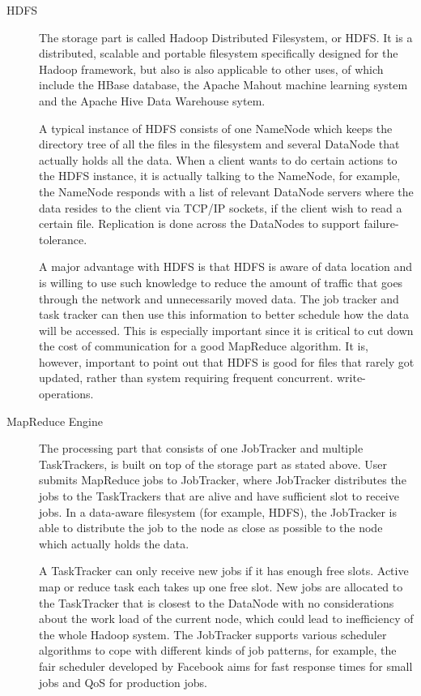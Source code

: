 \documentclass{article}
\begin{document}
\begin{description}
\item[HDFS] The storage part is called Hadoop Distributed Filesystem, or HDFS. It is a distributed, scalable and portable filesystem specifically designed for the Hadoop framework, but also is also applicable to other uses, of which include the HBase database, the Apache Mahout machine learning system and the Apache Hive Data Warehouse sytem.\cite{wiki:hadoop}

A typical instance of HDFS consists of one NameNode which keeps the directory tree of all the files in the filesystem and several DataNode that actually holds all the data. When a client wants to do certain actions to the HDFS instance, it is actually talking to the NameNode, for example, the NameNode responds with a list of relevant DataNode servers where the data resides to the client via TCP/IP sockets, if the client wish to read a certain file.\cite{hwiki:hadoop} Replication is done across the DataNodes to support failure-tolerance.

A major advantage with HDFS is that HDFS is aware of data location and is willing to use such knowledge to reduce the amount of traffic that goes through the network and unnecessarily moved data. The job tracker and task tracker can then use this information to better schedule how the data will be accessed. This is especially important since it is critical to cut down the cost of communication for a good MapReduce algorithm.\cite{ullman2012designing} It is, however, important to point out that HDFS is good for files that rarely got updated, rather than system requiring frequent concurrent. write-operations.\cite{wiki:hadoop}

\item[MapReduce Engine] The processing part that consists of one JobTracker and multiple TaskTrackers, is built on top of the storage part as stated above. User submits MapReduce jobs to JobTracker, where JobTracker distributes the jobs to the TaskTrackers that are alive and have sufficient slot to receive jobs. In a data-aware filesystem (for example, HDFS), the JobTracker is able to distribute the job to the node as close as possible to the node which actually holds the data.\cite{wiki:hadoop}

A TaskTracker can only receive new jobs if it has enough free slots. Active map or reduce task each takes up one free slot. New jobs are allocated to the TaskTracker that is closest to the DataNode with no considerations about the work load of the current node, which could lead to inefficiency of the whole Hadoop system. The JobTracker supports various scheduler algorithms to cope with different kinds of job patterns, for example, the fair scheduler developed by Facebook aims for fast response times for small jobs and QoS for production jobs.
\end{description}
\end{document}
